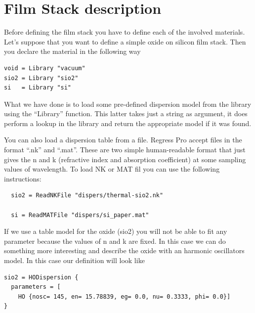 \documentclass[a4paper]{report}
\begin{document}
\section{Film Stack description}
Before defining the film stack you have to define each of the involved
materials. Let's suppose that you want to define a simple oxide on
silicon film stack. Then you declare the material in the following way

\begin{verbatim}
void = Library "vacuum"
sio2 = Library "sio2"
si   = Library "si"
\end{verbatim}

What we have done is to load some pre-defined dispersion model from the library using the ``Library'' function.
This latter takes just a string as argument, it does perform a lookup in the library and return the appropriate model if it was found.

You can also load a dispersion table from a file.
Regress Pro accept files in the format ``.nk'' and ``.mat''.
These are two simple human-readable format that just gives the n and k (refractive index and absorption coefficient) at some sampling values of wavelength.
To load NK or MAT fil you can use the following instructions:

\begin{verbatim}
  sio2 = ReadNKFile "dispers/thermal-sio2.nk"

  si = ReadMATFile "dispers/si_paper.mat"
\end{verbatim}

If we use a table model for the oxide (sio2) you will not be able to fit any parameter because the values of n and k are fixed.
In this case we can do something more interesting and describe the oxide with an harmonic oscillators model.
In this case our definition will look like
\begin{verbatim}
sio2 = HODispersion {
  parameters = [
    HO {nosc= 145, en= 15.78839, eg= 0.0, nu= 0.3333, phi= 0.0}]
}
\end{verbatim}
\end{document}
